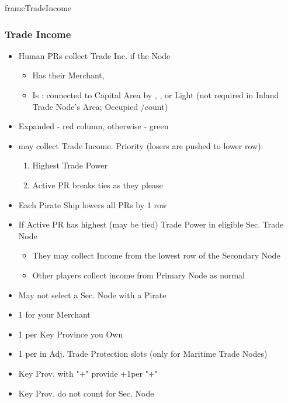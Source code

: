 \documentclass[10pt]{article}
\newlength{\fhActionCards} \setlength\fhActionCards{15\baselineskip}
\newlength{\fhTrade} \setlength\fhTrade{\calc{\textheight - \fhActionCards - \frameToFrameSpacing}}
\begin{document}
\begin{dynamiccontents*}{frameTradeIncome}\begin{eubox}{\fhTrade}
	\subsubsection*{Trade Income }
	\begin{itemize}
		\item Human PRs collect Trade Inc. if the Node
		\begin{itemize}
			\item Has their Merchant, 
			\item Is : connected to Capital Area by \towns, \vassals, \influence or Light \ships (not required in Inland Trade Node's Area; Occupied \towns/\vassals count)
		\end{itemize}
		\item Expanded - red column, otherwise - green
		\item {} may collect Trade Income. Priority (losers are pushed to lower row):
		\begin{enumerate}
			\item Highest Trade Power
			\item Active PR breaks ties as they please
		\end{enumerate}
		\item Each Pirate Ship lowers all PRs by 1 row
	\end{itemize}
	\begin{itemize}
		\item If Active PR has highest (may be tied) Trade Power in eligible Sec. Trade Node
		\begin{itemize}
			\item They may collect Income from the lowest row of the Secondary Node
			\item Other players collect income from Primary Node as normal
		\end{itemize}
		\item May not select a Sec. Node with a Pirate
	\end{itemize}
	\begin{itemize}
		\item 1 \tradepower for your Merchant
		\item 1 \tradepower per Key Province you Own
		\item 1 \tradepower per \ship in Adj. Trade Protection slots (only for Maritime Trade Nodes)
		\item Key Prov. with "+" provide +1\tradepower per "+"
		\item Key Prov. do not count for Sec. Node
	\end{itemize}
	{\botrules
}
\end{eubox}
\end{dynamiccontents*}
\end{document}
